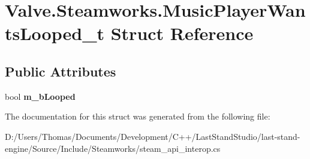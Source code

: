 \hypertarget{structValve_1_1Steamworks_1_1MusicPlayerWantsLooped__t}{}\section{Valve.\+Steamworks.\+Music\+Player\+Wants\+Looped\+\_\+t Struct Reference}
\label{structValve_1_1Steamworks_1_1MusicPlayerWantsLooped__t}
\subsection*{Public Attributes}
\begin{DoxyCompactItemize}
\item 
\hypertarget{structValve_1_1Steamworks_1_1MusicPlayerWantsLooped__t_a466334b835297f17d7013573150799a2}{}bool {\bfseries m\+\_\+b\+Looped}\label{structValve_1_1Steamworks_1_1MusicPlayerWantsLooped__t_a466334b835297f17d7013573150799a2}

\end{DoxyCompactItemize}


The documentation for this struct was generated from the following file\+:\begin{DoxyCompactItemize}
\item 
D\+:/\+Users/\+Thomas/\+Documents/\+Development/\+C++/\+Last\+Stand\+Studio/last-\/stand-\/engine/\+Source/\+Include/\+Steamworks/steam\+\_\+api\+\_\+interop.\+cs\end{DoxyCompactItemize}

